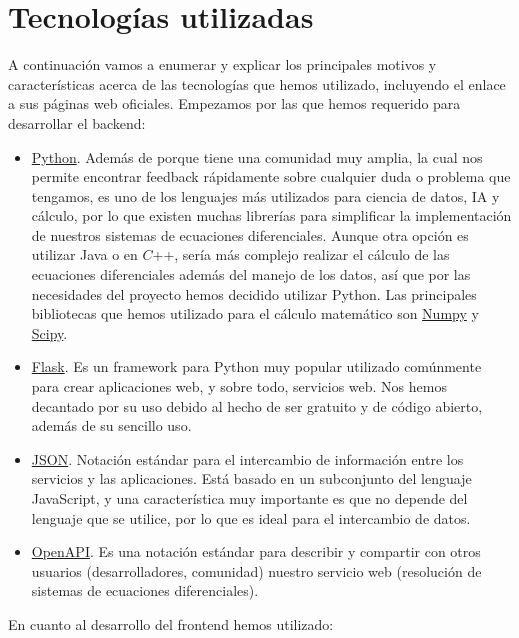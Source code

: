 \section{Tecnologías utilizadas}
A continuación vamos a enumerar y explicar los principales motivos y características acerca de las tecnologías que hemos utilizado, incluyendo el enlace a sus páginas web oficiales. Empezamos por las que hemos requerido para desarrollar el backend:
\begin{itemize}
	\item \href{https://www.python.org}{Python}. Además de porque tiene una comunidad muy amplia, la cual nos permite encontrar feedback rápidamente sobre cualquier duda o problema que tengamos, es uno de los lenguajes más utilizados para ciencia de datos, IA y cálculo, por lo que existen muchas librerías para simplificar la implementación de nuestros sistemas de ecuaciones diferenciales. Aunque otra opción es utilizar Java o en $C$++, sería más complejo realizar el cálculo de las ecuaciones diferenciales además del manejo de los datos, así que por las necesidades del proyecto hemos decidido utilizar Python. Las principales bibliotecas que hemos utilizado para el cálculo matemático son \href{https://numpy.org}{Numpy} y \href{https://scipy.org}{Scipy}.
	\item \href{https://flask.palletsprojects.com/en/3.0.x/}{Flask}. Es un framework para Python muy popular utilizado comúnmente para crear aplicaciones web, y sobre todo, servicios web. Nos hemos decantado por su uso debido al hecho de ser gratuito y de código abierto, además de su sencillo uso.
	\item \href{https://www.json.org/json-es.html}{JSON}. Notación estándar para el intercambio de información entre los servicios y las aplicaciones. Está basado en un subconjunto del lenguaje JavaScript, y una característica muy importante es que no depende del lenguaje que se utilice, por lo que es ideal para el intercambio de datos.
	\item \href{https://www.openapis.org}{OpenAPI}. Es una notación estándar para describir y compartir con otros usuarios (desarrolladores, comunidad) nuestro servicio web (resolución de sistemas de ecuaciones diferenciales).
\end{itemize}
En cuanto al desarrollo del frontend hemos utilizado:
